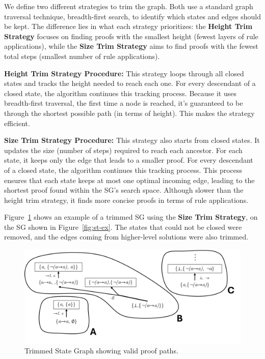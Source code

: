 \documentclass[runningheads]{llncs}
\begin{document}
We define two different strategies to trim the graph. Both use a standard graph traversal technique, breadth-first search, to identify which states and edges should be kept. The difference lies in what each strategy prioritizes: the \textbf{Height Trim Strategy} focuses on finding proofs with the smallest height (fewest layers of rule applications), while the \textbf{Size Trim Strategy} aims to find proofs with the fewest total steps (smallest number of rule applications).


\vspace{1em}
\textbf{Height Trim Strategy Procedure:}  
This strategy loops through all closed states and tracks the height needed to reach each one. For every descendant of a closed state, the algorithm continues this tracking process. Because it uses breadth-first traversal, the first time a node is reached, it’s guaranteed to be through the shortest possible path (in terms of height). This makes the strategy efficient.

\vspace{0.5em}
\textbf{Size Trim Strategy Procedure:}  
This strategy also starts from closed states. It updates the size (number of steps) required to reach each ancestor. For each state, it keeps only the edge that leads to a smaller proof. For every descendant
of a closed state, the algorithm continues this tracking process. This process ensures that each state keeps at most one optimal incoming edge, leading to the shortest proof found within the SG's search space. Although slower than the height trim strategy, it finds more concise proofs in terms of rule applications.

\vspace{1em}
Figure~\ref{fig:sg-trim} shows an example of a trimmed SG using the \textbf{Size Trim Strategy}, on the SG shown in Figure~\ref{fig:st-ex}. The states that could not be closed were removed, and the edges coming from higher-level solutions were also trimmed.


\vspace{-1em}
\begin{figure}
    \centering
    \includegraphics[width=1\linewidth]{resources/sg-final.jpg}
    \caption{Trimmed State Graph showing valid proof paths.}
    \label{fig:sg-trim}
\end{figure}
\vspace{-2em}
\end{document}
